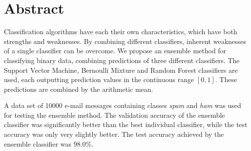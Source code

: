 \section*{Abstract}

Classification algorithms have each their own characteristics, which
have both strengths and weaknesses. By combining different classifiers,
inherent weaknesses of a single classifier can be overcome. We propose
an ensemble method for classifying binary data, combining predictions of
three different classifiers. The Support Vector Machine, Bernoulli
Mixture and Random Forest classifiers are used, each outputting
prediction values in the continuous range $[0,1]$. These predictions are
combined by the arithmetic mean.

A data set of 10000 e-mail messages containing classes \emph{spam} and
\emph{ham} was used for testing the ensemble method. The validation
accuracy of the ensemble classifier was significantly better than the
best individual classifier, while the test accuracy was only very
slightly better. The test accuracy achieved by the ensemble classifier
was $98.0 \%$.
